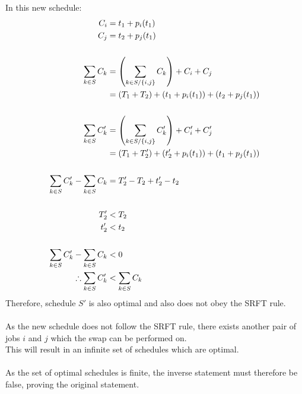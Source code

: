 \documentclass[a4paper, fleqn]{article}
\begin{document}
In this new schedule:
$$
\begin{aligned}
C_i&=t_1+p_i(t_1)\\
C_j&=t_2+p_j(t_1)\\
\vspace{1pt}\\
\sum_{k\in S} C_k&=\left(\sum_{k\in S/\{i,j\}}C_k\right)+C_i+C_j\\
&=(T_1+T_2)+(t_1+p_i(t_1))+(t_2+p_j(t_1))\\
\vspace{1pt}\\
\sum_{k\in S} C_k'&=\left(\sum_{k\in S/\{i,j\}}C_k'\right)+C_i'+C_j'\\
&=(T_1+T_2')+(t_2'+p_i(t_1))+(t_1+p_j(t_1))\\
\vspace{1pt}\\
\sum_{k\in S} C_k'-\sum_{k\in S} C_k&=T_2'-T_2+t_2'-t_2\\
\vspace{1pt}\\
T_2'&<T_2\\
t_2'&<t_2\\
\vspace{1pt}\\
\sum_{k\in S} C_k'-\sum_{k\in S} C_k &<0\\
\therefore \sum_{k\in S} C_k'&<\sum_{k\in S} C_k
\end{aligned}
$$
Therefore, schedule $S'$ is also optimal and also does not obey the SRFT rule.\\
\vspace{1pt}\\
As the new schedule does not follow the SRFT rule, there exists another pair of jobs $i$ and $j$ which the swap can be performed on.\\
This will result in an infinite set of schedules which are optimal.\\
\vspace{1pt}\\
As the set of optimal schedules is finite, the inverse statement must therefore be false, proving the original statement.
\pagebreak
\end{document}
